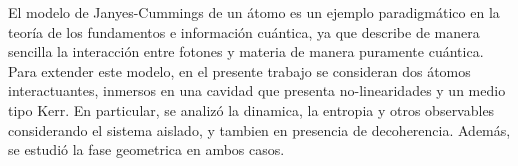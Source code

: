 \newenvironment{abstract}%
{\thispagestyle{empty} \cleardoublepage\null \thispagestyle{empty} \vfill\begin{center}
\bfseries \abstractname \end{center} }%
{\thispagestyle{empty} \vfill\null }


\begin{abstract}
El modelo de Janyes-Cummings de un \'atomo es un ejemplo paradigm\'atico en la teor\'ia de los fundamentos e informaci\'on cu\'antica, ya que describe de 
manera sencilla la interacci\'on entre fotones y materia de manera puramente cu\'antica. Para extender este modelo, en el presente trabajo se consideran 
dos \'atomos interactuantes, inmersos en una cavidad que presenta no-linearidades y un medio tipo Kerr. En particular, se analiz\'o la dinamica, la 
entropia y otros observables considerando el sistema aislado, y tambien en presencia de decoherencia. Adem\'as, se estudi\'o la fase geometrica en ambos
casos.







\end{abstract}







